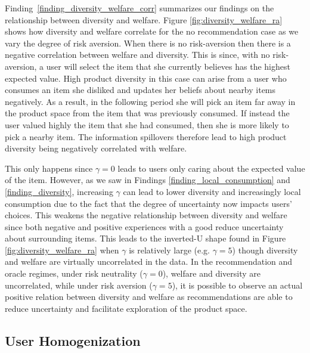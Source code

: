 \documentclass[manuscript]{acmart}
\begin{document}
Finding~\ref{finding_diversity_welfare_corr} summarizes our findings on the relationship between diversity and welfare. Figure \ref{fig:diversity_welfare_ra} shows how diversity and welfare correlate for the no recommendation case as we vary the degree of risk aversion. When there is no risk-aversion then there is a negative correlation between welfare and diversity. This is since, with no risk-aversion, a user will select the item that she currently believes has the highest expected value. High product diversity in this case can arise from a user who consumes an item she disliked and updates her beliefs about nearby items negatively. As a result, in the following period she will pick an item far away in the product space from the item that was previously consumed. If instead the user valued highly the item that she had consumed, then she is more likely to pick a nearby item. The information spillovers therefore lead to high product diversity being negatively correlated with welfare.
\par
This only happens since $\gamma = 0$ leads to users only caring about the expected value of the item. However, as we saw in Findings \ref{finding_local_consumption} and \ref{finding_diversity}, increasing $\gamma$ can lead to lower diversity and increasingly local consumption due to the fact that the degree of uncertainty now impacts users' choices. This weakens the negative relationship between diversity and welfare since both negative and positive experiences with a good reduce uncertainty about surrounding items. This leads to the inverted-U shape found in Figure \ref{fig:diversity_welfare_ra} when $\gamma$ is relatively large (e.g. $\gamma = 5$) though diversity and welfare are virtually uncorrelated in the data. In the recommendation and oracle regimes, under risk neutrality ($\gamma=0$), welfare and diversity are uncorrelated, while under risk aversion ($\gamma=5$), it is possible to observe an actual positive relation between diversity and welfare as recommendations are able to reduce uncertainty and facilitate exploration of the product space.

\subsection{User Homogenization}
\end{document}
